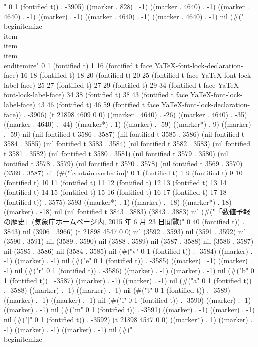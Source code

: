 " 0 1 (fontified t)) . -3905) ((marker . 828) . -1) ((marker . 4640) . -1) ((marker . 4640) . -1) ((marker) . -1) ((marker . 4640) . -1) ((marker . 4640) . -1) nil (#(" \\begin{itemize} 
  \\item 
  \\item 
  \\item 
 \\end{itemize}" 0 1 (fontified t) 1 16 (fontified t face YaTeX-font-lock-declaration-face) 16 18 (fontified t) 18 20 (fontified t) 20 25 (fontified t face YaTeX-font-lock-label-face) 25 27 (fontified t) 27 29 (fontified t) 29 34 (fontified t face YaTeX-font-lock-label-face) 34 38 (fontified t) 38 43 (fontified t face YaTeX-font-lock-label-face) 43 46 (fontified t) 46 59 (fontified t face YaTeX-font-lock-declaration-face)) . -3906) (t 21898 4609 0 0) ((marker . 4640) . -26) ((marker . 4640) . -35) ((marker . 4640) . -44) ((marker*) . 1) ((marker) . -59) ((marker*) . 9) ((marker) . -59) nil (nil fontified t 3586 . 3587) (nil fontified t 3585 . 3586) (nil fontified t 3584 . 3585) (nil fontified t 3583 . 3584) (nil fontified t 3582 . 3583) (nil fontified t 3581 . 3582) (nil fontified t 3580 . 3581) (nil fontified t 3579 . 3580) (nil fontified t 3578 . 3579) (nil fontified t 3570 . 3578) (nil fontified t 3569 . 3570) (3569 . 3587) nil (#("[containsverbatim]" 0 1 (fontified t) 1 9 (fontified t) 9 10 (fontified t) 10 11 (fontified t) 11 12 (fontified t) 12 13 (fontified t) 13 14 (fontified t) 14 15 (fontified t) 15 16 (fontified t) 16 17 (fontified t) 17 18 (fontified t)) . 3575) 3593 ((marker*) . 1) ((marker) . -18) ((marker*) . 18) ((marker) . -18) nil (nil fontified t 3843 . 3883) (3843 . 3883) nil (#("「数値予報の歴史」(気象庁ホームページ内, 2015 年 6 月 23 日閲覧)" 0 40 (fontified t)) . 3843) nil (3906 . 3966) (t 21898 4547 0 0) nil (3592 . 3593) nil (3591 . 3592) nil (3590 . 3591) nil (3589 . 3590) nil (3588 . 3589) nil (3587 . 3588) nil (3586 . 3587) nil (3585 . 3586) nil (3584 . 3585) nil (#("v" 0 1 (fontified t)) . -3584) ((marker) . -1) ((marker) . -1) nil (#("e" 0 1 (fontified t)) . -3585) ((marker) . -1) ((marker) . -1) nil (#("r" 0 1 (fontified t)) . -3586) ((marker) . -1) ((marker) . -1) nil (#("b" 0 1 (fontified t)) . -3587) ((marker) . -1) ((marker) . -1) nil (#("a" 0 1 (fontified t)) . -3588) ((marker) . -1) ((marker) . -1) nil (#("t" 0 1 (fontified t)) . -3589) ((marker) . -1) ((marker) . -1) nil (#("i" 0 1 (fontified t)) . -3590) ((marker) . -1) ((marker) . -1) nil (#("m" 0 1 (fontified t)) . -3591) ((marker) . -1) ((marker) . -1) nil (#("]" 0 1 (fontified t)) . -3592) (t 21898 4547 0 0) ((marker*) . 1) ((marker) . -1) ((marker) . -1) ((marker) . -1) nil (#(" \\begin{itemize} 
